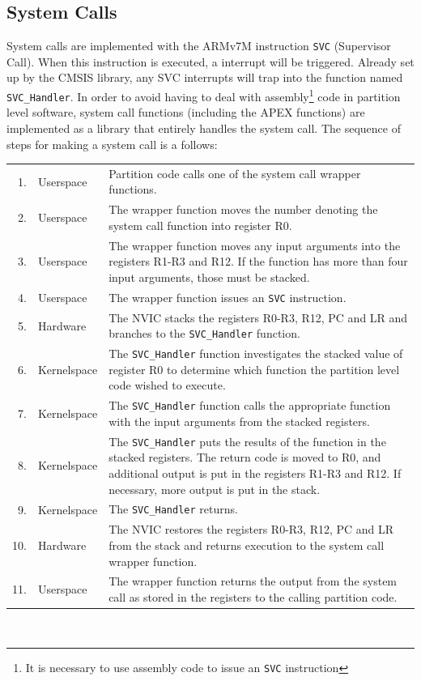 \subsection{System Calls}
System calls are implemented with the ARMv7M instruction \texttt{SVC} (Supervisor
Call). When this instruction is executed, a interrupt will be triggered. Already
set up by the CMSIS library, any SVC interrupts will trap into the function
named \texttt{SVC\_Handler}.
In order to avoid having to deal with assembly\footnote{It is necessary to use
assembly code to issue an \texttt{SVC} instruction} code in partition level
software, system call functions (including the APEX functions) are implemented
as a library that entirely handles the system call.
The sequence of steps for making a system call is a follows:\\

\noindent\begin{tabular}{ r l p{10.5cm} }
    1. & Userspace & Partition code calls one of the system call wrapper
    functions.\\
    2. & Userspace & The wrapper function moves the number denoting the system
    call function into register R0.\\
    3. & Userspace & The wrapper function moves any input arguments into the
    registers R1-R3 and R12. If the function has more than four input arguments,
    those must be stacked.\\
    4. & Userspace & The wrapper function issues an \texttt{SVC} instruction.\\
    5. & Hardware & The NVIC stacks the registers R0-R3, R12, PC and LR and
    branches to the \texttt{SVC\_Handler} function.\\
    6. & Kernelspace & The \texttt{SVC\_Handler} function investigates the
    stacked value of register R0 to determine which function the partition level
    code wished to execute.\\
    7. & Kernelspace & The \texttt{SVC\_Handler} function calls the appropriate
    function with the input arguments from the stacked registers.\\
    8. & Kernelspace & The \texttt{SVC\_Handler} puts the results of the
    function in the stacked registers. The return code is moved to R0, and
    additional output is put in the registers R1-R3 and R12. If necessary, more
    output is put in the stack.\\
    9. & Kernelspace & The \texttt{SVC\_Handler} returns.\\
    10. & Hardware & The NVIC restores the registers R0-R3, R12, PC and LR from
    the stack and returns execution to the system call wrapper function.\\
    11. & Userspace & The wrapper function returns the output from the system
    call as stored in the registers to the calling partition code.\\
\end{tabular}\\



